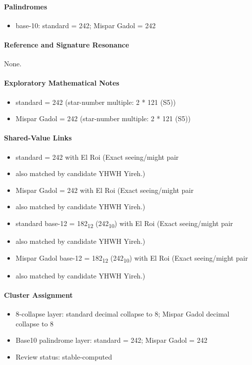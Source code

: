 \paragraph{Palindromes}
\begin{itemize}
\item base-10: standard = 242; Mispar Gadol = 242
\end{itemize}
\paragraph{Reference and Signature Resonance}
None.
\paragraph{Exploratory Mathematical Notes}
\begin{itemize}
\item standard = 242 (star-number multiple: 2 * 121 (S5))
\item Mispar Gadol = 242 (star-number multiple: 2 * 121 (S5))
\end{itemize}
\paragraph{Shared-Value Links}
\begin{itemize}
\item standard = 242 with El Roi (Exact seeing/might pair
\item also matched by candidate YHWH Yireh.)
\item Mispar Gadol = 242 with El Roi (Exact seeing/might pair
\item also matched by candidate YHWH Yireh.)
\item standard base-12 = 182\textsubscript{12} (242\textsubscript{10}) with El Roi (Exact seeing/might pair
\item also matched by candidate YHWH Yireh.)
\item Mispar Gadol base-12 = 182\textsubscript{12} (242\textsubscript{10}) with El Roi (Exact seeing/might pair
\item also matched by candidate YHWH Yireh.)
\end{itemize}
\paragraph{Cluster Assignment}
\begin{itemize}
\item 8-collapse layer: standard decimal collapse to 8; Mispar Gadol decimal collapse to 8
\item Base10 palindrome layer: standard = 242; Mispar Gadol = 242
\item Review status: stable-computed
\end{itemize}
